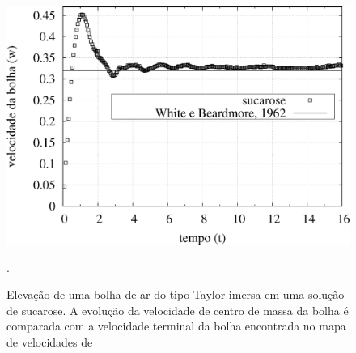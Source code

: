 \documentclass[a4paper,portuges,12pt]{article}
\begin{document}
 \begin{figure}[h]
 	\begin{center}
 		\includegraphics[angle=0, scale=0.5]{figs/sucrose.pdf}
 	\end{center}
	\caption{Elevação de uma bolha de ar do tipo Taylor imersa em uma
	solução de sucarose. A evolução da velocidade de centro de massa da
	bolha é comparada com a velocidade terminal da bolha encontrada no
	mapa de velocidades de \cite{white1962}}.
   \label{fig:sucroseVel}
 \end{figure}
\end{document}
